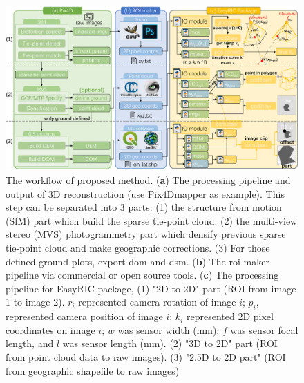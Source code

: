 \documentclass{configs/bmcart}
\begin{document}
\begin{backmatter}
\begin{figure}[!htb]
  \includegraphics[width=0.95\linewidth]{figures/workflow.pdf}
  \caption{The workflow of proposed method. (\textbf{a}) The processing pipeline and output of 3D reconstruction (use Pix4Dmapper as example). This step can be separated into 3 parts: (1) the structure from motion (SfM) part which build the sparse tie-point cloud. (2) the multi-view stereo (MVS) photogrammetry part which densify previous sparse tie-point cloud and make geographic corrections. (3) For those defined ground plots, export \acrfull*{dom} and \acrfull*{dsm}. (\textbf{b}) The \acrfull*{roi} maker pipeline via commercial or open source tools. (\textbf{c}) The processing pipeline for EasyRIC package, (1) "2D to 2D" part (ROI from image 1 to image 2). $r_i$ represented camera rotation of image $i$; $p_i$, represented camera position of image $i$; $k_i$ represented 2D pixel coordinates on image $i$; $w$ was sensor width (mm); $f$ was sensor focal length, and $l$ was sensor length (mm). (2) "3D to 2D" part (ROI from point cloud data to raw images). (3) "2.5D to 2D part" (ROI from geographic shapefile to raw images)}
  \label{fig:workflow}
\end{figure}


\end{backmatter}
\end{document}

